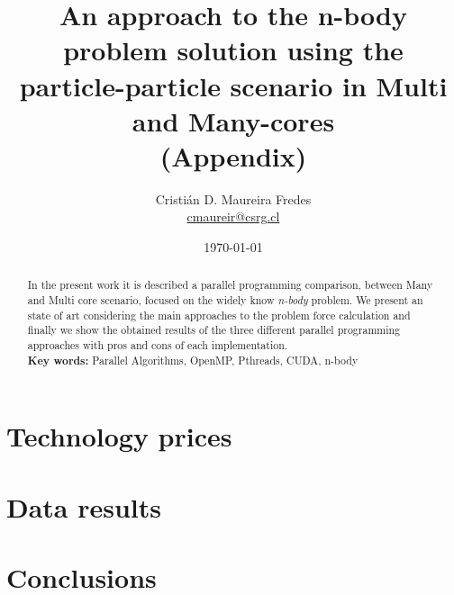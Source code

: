 \documentclass[letter, 10pt]{article}
\begin{document}
\pagestyle{empty}

\title{An approach to the n-body problem solution using the particle-particle scenario in Multi and Many-cores\\(Appendix)}
\author{Cristián D. Maureira Fredes\\\url{cmaureir@csrg.cl}}
\date{\today}

\maketitle
\begin{abstract}
In the present work it is described a parallel programming
comparison, between Many and Multi core scenario,
focused on the widely know \emph{n-body} problem.
We present an state of art considering the main approaches to
the problem force calculation and finally
we show the obtained results of the three different
parallel programming approaches with pros and cons
of each implementation.
\\
\textbf{Key words:} Parallel Algorithms, OpenMP, Pthreads, CUDA, n-body

\end{abstract}

%
%
%
%
%
%
%
%
%
%
%
%
%
%
%
\newpage
\section{Technology prices}


\newpage
\section{Data results}


\newpage
\section{Conclusions}

\end{document}
